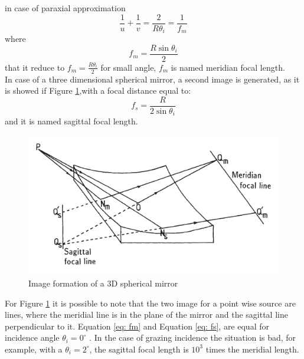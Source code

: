 \noindent in case of paraxial approximation
\begin{equation}
\frac{1}{u} + \frac{1}{v} = \frac{2}{R \theta_i} = \frac{1}{f_m}
\label{eq: reflection law}
\end{equation}
\noindent where
\begin{equation}
f_m = \frac{R \sin \theta_i}{2}
\label{eq: fm}
\end{equation}
\noindent that it reduce to $f_m = \frac{R \theta_i}{2} $ for small angle, $f_m $ is named meridian focal length. 
\\
In case of a three dimensional spherical mirror, a second image is generated, as it is showed if Figure \ref{fig: MeridianAndSagittal},with a focal distance equal to:
\begin{equation}
f_s = \frac{R}{2 \sin \theta_i}
\label{eq: fs}
\end{equation}
\noindent and it is named sagittal focal length.
\begin{figure}[]
%
\centering
%
\includegraphics[width=.6\textwidth]{Immagini/Chapter2/MeridianAndSagittal}
%
\caption{Image formation of a 3D spherical mirror}
%
\label{fig: MeridianAndSagittal}
%
\end{figure}
\noindent For Figure \ref{fig: MeridianAndSagittal} it is possible to note that the two image for a point wise source are lines, where the meridial line is in the plane of the mirror and the sagittal line perpendicular to it. Equation \ref{eq: fm} and Equation \ref{eq: fs}, are equal for incidence angle $\theta_i = 0^{\circ} $ . In the case of grazing incidence the situation is bad, for example, with a $\theta_i = 2^{\circ} $, the sagittal focal length is $10^3$ times the meridial length.
